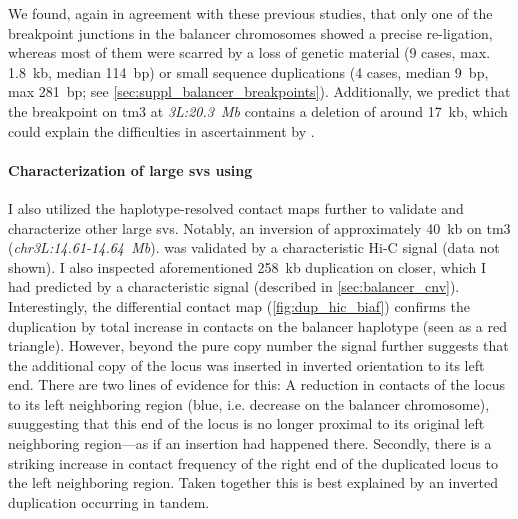 We found, again in agreement with these previous
studies, that only one of the breakpoint junctions in the balancer chromosomes
showed a precise re-ligation, whereas most of them were scarred by a
loss of genetic material (9 cases, max. 1.8~kb, median 114~bp) or small sequence
duplications (4 cases, median 9~bp, max 281~bp; see
\cref{sec:suppl_balancer_breakpoints}). Additionally, we predict that the
breakpoint on \ac{tm3} at \textit{3L:20.3~Mb} contains a deletion of around 17~kb, which could
explain the difficulties in ascertainment by \citet{Miller2016}.

\paragraph{Characterization of large \acp{sv} using \hic}
I also utilized the haplotype-resolved contact maps further to validate and
characterize other large \acp{sv}. Notably, an inversion of approximately 40~kb
on \ac{tm3} (\textit{chr3L:14.61-14.64~Mb}). was
validated by a characteristic Hi-C signal (data not shown). I also inspected
aforementioned 258~kb duplication on \cyo closer, which I had predicted by a
characteristic \baf signal (described in
\cref{sec:balancer_cnv}). Interestingly, the differential \hic contact map
(\cref{fig:dup_hic_biaf}) confirms the duplication by total increase in contacts
on the balancer haplotype (seen as a red triangle). However, beyond the pure copy
number the \hic signal further suggests that the additional copy of the locus was
inserted in inverted orientation to its left end. There are two lines of evidence
for this: A reduction in contacts of the locus to its left neighboring region
(blue, i.e. decrease on the balancer chromosome), suuggesting that this end of the locus is no longer
proximal to its original left neighboring region---as if an insertion had
happened there. Secondly, there is a striking increase in contact frequency
of the right end of the duplicated locus to the left neighboring region. Taken
together this is best explained by an inverted duplication occurring in tandem.

